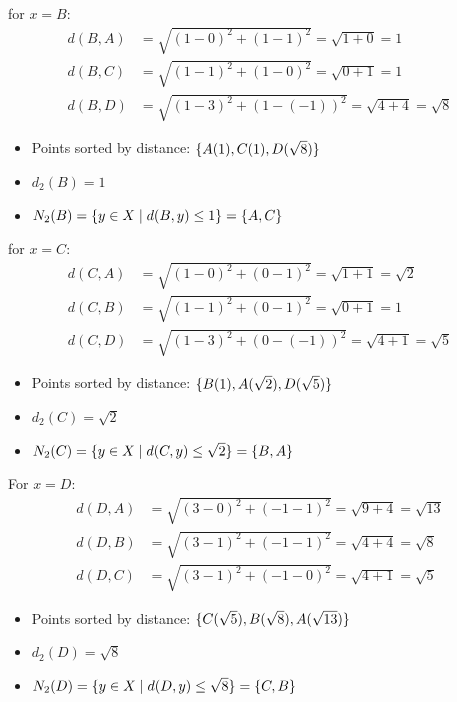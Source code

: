 \documentclass{article}
\begin{document}
for $x = B$:
\begin{align*}
    d(B,A) &= \sqrt{(1-0)^2 + (1 - 1)^2} = \sqrt{1 + 0} = 1 \\
    d(B,C) &= \sqrt{(1-1)^2 + (1 - 0)^2} = \sqrt{0 + 1} = 1 \\
    d(B,D) &= \sqrt{(1-3)^2 + (1 - (-1))^2} = \sqrt{4 + 4} = \sqrt{8}
\end{align*}

\begin{itemize}
    \item Points sorted by distance: $\{A (1), C (1), D (\sqrt{8})\}$
    \item $d_2(B) = 1$
    \item $N_2(B) = \{y \in X \mid d(B, y) \leq 1\} = \{A,C\}$
\end{itemize}

for $x = C$: 
\begin{align*}
    d(C,A) &= \sqrt{(1-0)^2 + (0 - 1)^2} = \sqrt{1 + 1} = \sqrt{2} \\
    d(C,B) &= \sqrt{(1-1)^2 + (0 - 1)^2} = \sqrt{0 + 1} = 1 \\
    d(C,D) &= \sqrt{(1-3)^2 + (0 - (-1))^2} = \sqrt{4 + 1} = \sqrt{5}
\end{align*}
\begin{itemize}
    \item Points sorted by distance: $\{B (1), A (\sqrt{2}), D (\sqrt{5})\}$
    \item $d_2(C) = \sqrt{2}$
    \item $N_2(C) = \{y \in X \mid d(C, y) \leq \sqrt{2}\} = \{B,A\}$
\end{itemize}

For $x=D$:
\begin{align*}
    d(D,A) &= \sqrt{(3-0)^2 + (-1 - 1)^2} = \sqrt{9 + 4} = \sqrt{13} \\
    d(D,B) &= \sqrt{(3-1)^2 + (-1 - 1)^2} = \sqrt{4 + 4} = \sqrt{8} \\
    d(D,C) &= \sqrt{(3-1)^2 + (-1 - 0)^2} = \sqrt{4 + 1} = \sqrt{5}
\end{align*}
\begin{itemize}
    \item Points sorted by distance: $\{C (\sqrt{5}), B (\sqrt{8}), A (\sqrt{13})\}$
    \item $d_2(D) = \sqrt{8}$
    \item $N_2(D) = \{y \in X \mid d(D, y) \leq \sqrt{8}\} = \{C,B\}$
\end{itemize}
\end{document}
